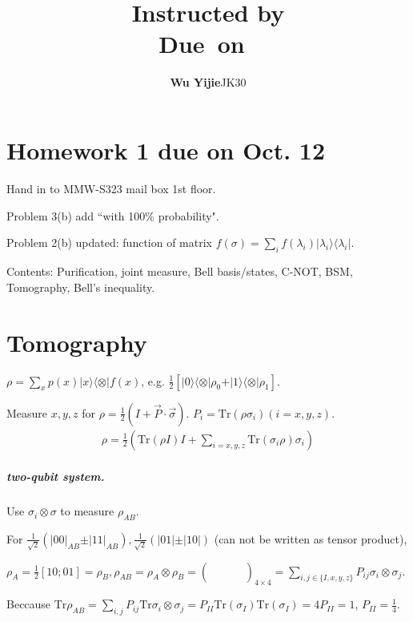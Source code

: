 \documentclass{article}
\title{\textmd{\bf \Class\\ \Title}\\{\large Instructed by \textit{\ClassInstructor}}\\\normalsize\vspace{0.1in}\small{Due\ on\ \DueDate}}
\date{}
\newcommand{\StudentName}{Wu Yijie}
\newcommand{\StudentClass}{JK30}
\newcommand{\StudentNumber}{2013011314}
\newcommand{\Tr}{\mathrm{Tr}}
\newcommand{\ket}[1]{\vert #1\vert}
\newcommand{\ketbra}[2]{\vert #1\rangle \langle #2\vert}
\begin{document}
\begin{spacing}{1.2}
\author{\textbf{\StudentName}\qquad\StudentClass\quad\StudentNumber}
\maketitle \thispagestyle{empty}
\section{Homework 1 due on Oct. 12}
Hand in to MMW-S323 mail box 1st floor.

Problem 3(b) add ``with 100\% probability".

Problem 2(b) updated: function of matrix $f(\sigma) = \sum_i f(\lambda_i) \ketbra{\lambda_i}{\lambda_i} $.

Contents: Purification, joint measure, Bell basis/states, C-NOT, BSM, Tomography, Bell's inequality.

\section{Tomography}
$\rho = \sum_x p(x)\ketbra{x} \otimes f(x)$, e.g. $\frac12 \left[ \ketbra{0} \otimes \rho_0 + \ketbra{1}\otimes \rho_1\right]$.

Measure $x,y,z$ for $\rho = \frac12 (I+\vec{P}\cdot\vec{\sigma})$. $P_i = \Tr(\rho\sigma_i)(i = x,y,z)$.
\begin{gather*}
\rho = \frac12 \left( \Tr(\rho I)I + \sum_{i=x,y,z}\Tr(\sigma_i \rho)\sigma_i\right)
\end{gather*}

\subparagraph{two-qubit system.}
Use $\sigma_i\otimes\sigma$ to measure $\rho_{AB}$. 

For $\frac{1}{\sqrt2}(\ket{00}_{AB}\pm \ket{11}_{AB}), \frac{1}{\sqrt2}(\ket{01}\pm\ket{10})$ (can not be written as tensor product),

$\rho_A = \frac{1}{2}[1 0; 0 1] = \rho_B, \rho_{AB} = \rho_A\otimes\rho_B = \left(\begin{array}{cccc}
&&&\\
&&&\\
&&&\\
&&&
\end{array}\right)_{4\times 4} = \sum_{i,j\in\{I,x,y,z\}}P_{ij}\sigma_i\otimes\sigma_j$.


Beccause $\Tr{\rho_{AB}} = \sum_{i,j}P_{ij}\Tr{\sigma_i\otimes\sigma_j} = P_{II}\Tr(\sigma_I)\Tr(\sigma_I) = 4P_{II}=1$, $P_{II} = \frac14$.


\end{spacing}
\end{document}
